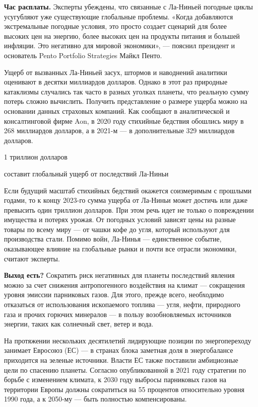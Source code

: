 \textbf{Час расплаты.} Эксперты убеждены, что связанные с Ла-Ниньей погодные циклы усугубляют уже существующие глобальные проблемы. «Когда добавляются экстремальные погодные условия, это просто создает сценарий для более высоких цен на энергию, более высоких цен на продукты питания и большей инфляции. Это негативно для мировой экономики», — пояснил президент и основатель Pento Portfolio Strategies Майкл Пенто.

Ущерб от вызванных Ла-Ниньей засух, штормов и наводнений аналитики оценивают в десятки миллиардов долларов. Однако в этот раз природные катаклизмы случались так часто в разных уголках планеты, что реальную сумму потерь сложно вычислить. Получить представление о размере ущерба можно на основании данных страховых компаний. Как сообщают в аналитической и консалтинговой фирме Aon, в 2020 году стихийные бедствия обошлись миру в 268 миллиардов долларов, а в 2021-м — в дополнительные 329 миллиардов долларов.

\begin{center}
    {\Huge
        1 триллион долларов
    }

    {\Large
        составит глобальный ущерб от последствий Ла-Ниньи
    }
\end{center}

Если будущий масштаб стихийных бедствий окажется соизмеримым с прошлыми годами, то к концу 2023-го сумма ущерба от Ла-Ниньи может достичь или даже превысить один триллион долларов. При этом речь идет не только о повреждении имущества и потерях урожая. От погодных условий зависят цены на разные товары по всему миру — от чашки кофе до угля, который используют для производства стали. Помимо войн, Ла-Нинья — единственное событие, оказывающее влияние на глобальные рынки и почти все отрасли экономики, считают эксперты.

\textbf{Выход есть?} Сократить риск негативных для планеты последствий явления можно за счет снижения антропогенного воздействия на климат — сокращения уровня эмиссии парниковых газов. Для этого, прежде всего, необходимо отказаться от использования ископаемого топлива — угля, нефти, природного газа и прочих горючих минералов — в пользу возобновляемых источников энергии, таких как солнечный свет, ветер и вода.

На протяжении нескольких десятилетий лидирующие позиции по энергопереходу занимает Евросоюз (ЕС) — в странах блока заметная доля в энергобалансе приходится на зеленые источники. Власти ЕС также поставили амбициозные цели по спасению планеты. Согласно опубликованной в 2021 году стратегии по борьбе с изменением климата, к 2030 году выбросы парниковых газов на территории Европы должны сократиться на 55 процентов относительно уровня 1990 года, а к 2050-му — быть полностью компенсированы.

